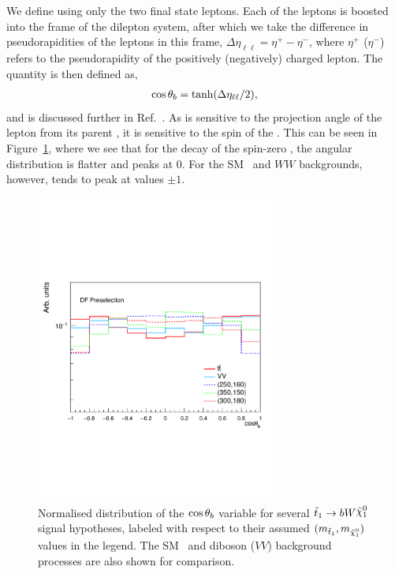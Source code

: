 We define \cosb using only the two final state leptons.
Each of the leptons is boosted into the frame of the dilepton system, after which
we take the difference in pseudorapidities of the leptons in this frame,
$\Delta \eta_{\ell \ell} = \eta^+ - \eta^-$, where $\eta^+$ ($\eta^-$) refers to the
pseudorapidity of the positively (negatively) charged lepton.
The quantity \cosb is then defined as,
\begin{align}
    \cos\theta_b = \tanh ( \Delta \eta_{\ell\ell} / 2),
    \label{eq:rjr_cosb}
\end{align}
and is discussed further in Ref.~\cite{Melia:2011cu}.
As \cosb is sensitive to the projection angle of the lepton from its parent \stopone, it is
sensitive to the spin of the \stopone.
This can be seen in Figure~\ref{fig:rjr_cosb}, where we see that for the decay of the
spin-zero \stopone, the angular distribution is flatter and peaks at 0.
For the SM \ttbar~and $WW$ backgrounds, however, \cosb tends to peak at values $\pm 1$.

\begin{figure}[!htb]
    \begin{center}
        \includegraphics[width=0.7\textwidth]{figures/search_stop2l/strategy/comp_plots/dfpresel_cosThetaB}
        \caption{
            Normalised distribution of the $\cos\theta_b$ variable for several $\stopone \rightarrow b W \ninoone$
            signal hypotheses, labeled with respect to their assumed $(m_{\stopone}, m_{\ninoone})$ values in the
            legend.
            The SM \ttbar~and diboson ($VV$) background processes are also shown for comparison.
        }
        \label{fig:rjr_cosb}
    \end{center}
\end{figure}

